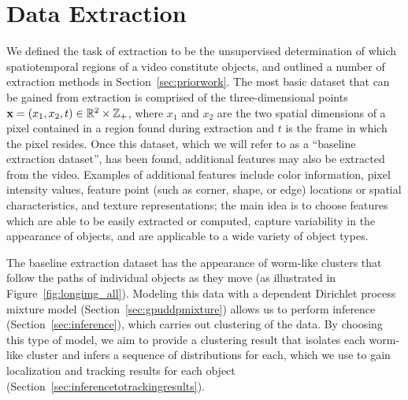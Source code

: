 \documentclass[twocolumn, final]{svjour3}
\begin{document}
\section{Data Extraction}
\label{sec:dataextraction}



We defined the task of extraction to be the unsupervised determination of which spatiotemporal regions of a video constitute objects, and outlined a number of extraction methods in Section~\ref{sec:priorwork}. The most basic dataset that can be gained from extraction is comprised of the three-dimensional points $\bold{x} = ( x_{1}, x_{2}, t ) \in \mathbb{R}^{2} \times \mathbb{Z}_{+}$, where $x_{1}$ and $x_{2}$ are the two spatial dimensions of a pixel contained in a region found during extraction and $t$ is the frame in which the pixel resides. Once this dataset, which we will refer to as a ``baseline extraction dataset'', has been found, additional features may also be extracted from the video. Examples of additional features include color information, pixel intensity values, feature point (such as corner, shape, or edge) locations or spatial characteristics, and texture representations; the main idea is to choose features which are able to be easily extracted or computed, capture variability in the appearance of objects, and are applicable to a wide variety of object types.

The baseline extraction dataset has the appearance of worm-like clusters that follow the paths of individual objects as they move (as illustrated in Figure~\ref{fig:longimg_all}). Modeling this data with a dependent Dirichlet process mixture model (Section~\ref{sec:gpuddpmixture}) allows us to perform inference (Section~\ref{sec:inference}), which carries out clustering of the data. By choosing this type of model, we aim to provide a clustering result that isolates each worm-like cluster and infers a sequence of distributions for each, which we use to gain localization and tracking results for each object (Section~\ref{sec:inferencetotrackingresults}).
\end{document}
